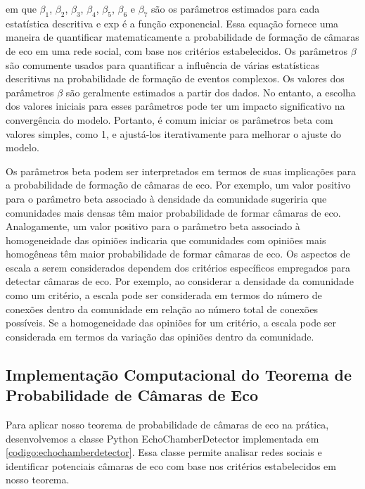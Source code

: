 em que $\beta_1$, $\beta_2$, $\beta_3$, $\beta_4$, $\beta_5$, $\beta_6$ e $\beta_7$ são os parâmetros estimados para cada estatística descritiva e exp é a função exponencial. Essa equação fornece uma maneira de quantificar matematicamente a probabilidade de formação de câmaras de eco em uma rede social, com base nos critérios estabelecidos. Os parâmetros $\beta$ são comumente usados para quantificar a influência de várias estatísticas descritivas na probabilidade de formação de eventos complexos. Os valores dos parâmetros $\beta$ são geralmente estimados a partir dos dados. No entanto, a escolha dos valores iniciais para esses parâmetros pode ter um impacto significativo na convergência do modelo. Portanto, é comum iniciar os parâmetros beta com valores simples, como 1, e ajustá-los iterativamente para melhorar o ajuste do modelo.

Os parâmetros beta podem ser interpretados em termos de suas implicações para a probabilidade de formação de câmaras de eco. Por exemplo, um valor positivo para o parâmetro beta associado à densidade da comunidade sugeriria que comunidades mais densas têm maior probabilidade de formar câmaras de eco. Analogamente, um valor positivo para o parâmetro beta associado à homogeneidade das opiniões indicaria que comunidades com opiniões mais homogêneas têm maior probabilidade de formar câmaras de eco. Os aspectos de escala a serem considerados dependem dos critérios específicos empregados para detectar câmaras de eco. Por exemplo, ao considerar a densidade da comunidade como um critério, a escala pode ser considerada em termos do número de conexões dentro da comunidade em relação ao número total de conexões possíveis. Se a homogeneidade das opiniões for um critério, a escala pode ser considerada em termos da variação das opiniões dentro da comunidade.

\subsection{Implementação Computacional do Teorema de Probabilidade de Câmaras de Eco}

Para aplicar nosso teorema de probabilidade de câmaras de eco na prática, desenvolvemos a classe Python EchoChamberDetector implementada em \autoref{codigo:echochamberdetector}. Essa classe permite analisar redes sociais e identificar potenciais câmaras de eco com base nos critérios estabelecidos em nosso teorema.

